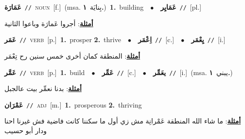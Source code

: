 \documentclass[10pt,a4paper,twoside]{article} %
\begin{document}
\begin{multicols}{2}
{\setlength\topsep{0pt}\textbf{\foreignlanguage{arabic}{عَمَارَة}}\ {\color{gray}\texttt{//}\color{black}}\ \textsc{noun}\ [f.]\ \color{gray}(msa. \foreignlanguage{arabic}{بِنايَة}~\foreignlanguage{arabic}{\textbf{١.}})\color{black}\ \textbf{1.}~building\ \ $\bullet$\ \ \setlength\topsep{0pt}\textbf{\foreignlanguage{arabic}{عَمَايِر}}\ {\color{gray}\texttt{//}\color{black}}\ [pl.]\  \begin{flushright}\color{gray}\foreignlanguage{arabic}{\textbf{\underline{\foreignlanguage{arabic}{أمثلة}}}: أجروا عَمارَة وباعوا الثانية}\end{flushright}\color{black}} \vspace{2mm}

{\setlength\topsep{0pt}\textbf{\foreignlanguage{arabic}{عَمَر}}\ {\color{gray}\texttt{//}\color{black}}\ \textsc{verb}\ [p.]\ \textbf{1.}~prosper  \textbf{2.}~thrive\ \ $\bullet$\ \ \setlength\topsep{0pt}\textbf{\foreignlanguage{arabic}{اِعْمَر}}\ {\color{gray}\texttt{//}\color{black}}\ [c.]\ \ $\bullet$\ \ \setlength\topsep{0pt}\textbf{\foreignlanguage{arabic}{يِعْمَر}}\ {\color{gray}\texttt{//}\color{black}}\ [i.]\  \begin{flushright}\color{gray}\foreignlanguage{arabic}{\textbf{\underline{\foreignlanguage{arabic}{أمثلة}}}: المنطقة كمان أخرى خمس سنين رح تِعْمَر}\end{flushright}\color{black}} \vspace{2mm}

{\setlength\topsep{0pt}\textbf{\foreignlanguage{arabic}{عَمَّر}}\ {\color{gray}\texttt{//}\color{black}}\ \textsc{verb}\ [p.]\ \textbf{1.}~build\ \ $\bullet$\ \ \setlength\topsep{0pt}\textbf{\foreignlanguage{arabic}{عَمِّر}}\ {\color{gray}\texttt{//}\color{black}}\ [c.]\ \ $\bullet$\ \ \setlength\topsep{0pt}\textbf{\foreignlanguage{arabic}{يعَمِّر}}\ {\color{gray}\texttt{//}\color{black}}\ [i.]\ \color{gray}(msa. \foreignlanguage{arabic}{يبني}~\foreignlanguage{arabic}{\textbf{١.}})\color{black}\  \begin{flushright}\color{gray}\foreignlanguage{arabic}{\textbf{\underline{\foreignlanguage{arabic}{أمثلة}}}: بدنا نعمِّر بيت عالجبل}\end{flushright}\color{black}} \vspace{2mm}

{\setlength\topsep{0pt}\textbf{\foreignlanguage{arabic}{عَمْرَان}}\ {\color{gray}\texttt{//}\color{black}}\ \textsc{adj}\ [m.]\ \textbf{1.}~prosperous  \textbf{2.}~thriving\  \begin{flushright}\color{gray}\foreignlanguage{arabic}{\textbf{\underline{\foreignlanguage{arabic}{أمثلة}}}: ما شاء الله المنطقة عَمْرانِة مش زي أول ما سكننا كانت فاضية فش غيرنا احنا ودار أبو حسيب}\end{flushright}\color{black}} \vspace{2mm}


\end{multicols}
\end{document}
